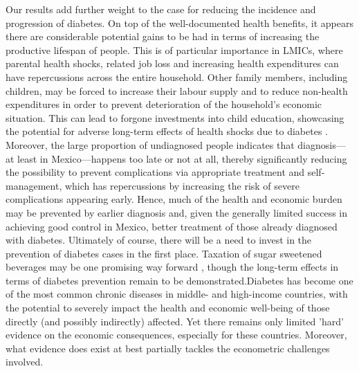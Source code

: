 Our results add further weight to the case for reducing the incidence and progression of diabetes. On top of the well-documented health benefits, it appears there are considerable potential gains to be had in terms of increasing the productive lifespan of people. This is of particular importance in \ac{LMICs}, where parental health shocks, related job loss and increasing health expenditures can have repercussions across the entire household. Other family members, including children, may be forced to increase their labour supply and to reduce non-health expenditures in order to prevent deterioration of the household's economic situation. This can lead to forgone investments into child education, showcasing the potential for adverse long-term effects of health shocks due to diabetes \parencite{Bratti2014}. Moreover, the large proportion of undiagnosed people indicates that diagnosis---at least in Mexico---happens too late or not at all, thereby significantly reducing the possibility to prevent complications via appropriate treatment and self-management, which has repercussions by increasing the risk of severe complications appearing early. Hence, much of the health and economic burden may be prevented by earlier diagnosis and, given the generally limited success in achieving good control in Mexico, better treatment of those already diagnosed with diabetes. Ultimately of course, there will be a need to invest in the prevention of diabetes cases in the first place. Taxation of sugar sweetened beverages may be one promising way forward \parencite{Colchero2016}, though the long-term effects in terms of diabetes prevention remain to be demonstrated.Diabetes has become one of the most common chronic diseases in middle- and high-income countries, with the potential to severely impact the health and economic well-being of those directly (and possibly indirectly) affected. Yet there remains only limited 'hard' evidence on the economic consequences, especially for these countries. Moreover, what evidence does exist at best partially tackles the econometric challenges involved. 







